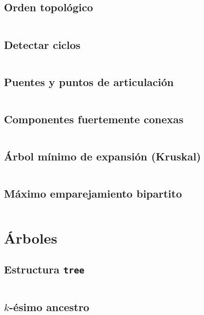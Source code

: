\documentclass[11pt]{article}
\begin{document}
		\subsection{Orden topológico}
		\inputminted[tabsize=2,breaklines,firstline=240,lastline=267,fontsize=\small]{c++}{graph.cpp}

		\subsection{Detectar ciclos}
		\inputminted[tabsize=2,breaklines,firstline=269,lastline=288,fontsize=\small]{c++}{graph.cpp}
		
		\subsection{Puentes y puntos de articulación}
		\inputminted[tabsize=2,breaklines,firstline=290,lastline=319,fontsize=\small]{c++}{graph.cpp}
		
		\subsection{Componentes fuertemente conexas}
		\inputminted[tabsize=2,breaklines,firstline=321,lastline=351,fontsize=\small]{c++}{graph.cpp}
		
		\subsection{Árbol mínimo de expansión (Kruskal)}
		\inputminted[tabsize=2,breaklines,firstline=373,lastline=389,fontsize=\small]{c++}{graph.cpp}
		
		\subsection{Máximo emparejamiento bipartito}
		\inputminted[tabsize=2,breaklines,firstline=391,lastline=445,fontsize=\small]{c++}{graph.cpp}
		
	\newpage
	\section{Árboles}		
		\subsection{Estructura \texttt{tree}}
		\inputminted[tabsize=2,breaklines,firstline=461,lastline=520,fontsize=\small]{c++}{graph.cpp}
		
		\subsection{$k$-ésimo ancestro}
		\inputminted[tabsize=2,breaklines,firstline=522,lastline=534,fontsize=\small]{c++}{graph.cpp}
		
\end{document}
